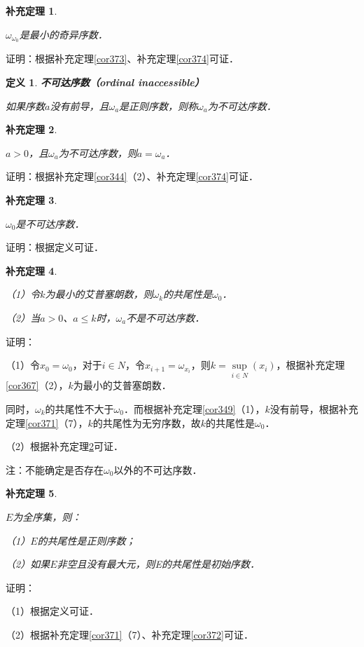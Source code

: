 \documentclass[12pt, a4paper, oneside]{book}
\newtheorem{cor}{补充定理}
\newtheorem{de}{定义}
\begin{document}
			\begin{cor}\label{cor375}
				\hfill\par
				$\omega_{\omega_0}$是最小的奇异序数．
			\end{cor}
			证明：根据补充定理\ref{cor373}、补充定理\ref{cor374}可证．
			
			\begin{de}
				\textbf{不可达序数（ordinal inaccessible）}
				\par
				如果序数$a$没有前导，且$\omega_a$是正则序数，则称$\omega_a$为不可达序数．
			\end{de}
			
			\begin{cor}\label{cor376}
				\hfill\par
				$a>0$，且$\omega_a$为不可达序数，则$a=\omega_a$．
			\end{cor}
			证明：根据补充定理\ref{cor344}（2）、补充定理\ref{cor374}可证．
			
			\begin{cor}\label{cor377}
				\hfill\par
				$\omega_0$是不可达序数．
			\end{cor}
			证明：根据定义可证．
			
			\begin{cor}\label{cor378}
				\hfill\par
				（1）令$k$为最小的艾普塞朗数，则$\omega_k$的共尾性是$\omega_0$．
				\par
				（2）当$a>0$、$a\leq k$时，$\omega_a$不是不可达序数．
			\end{cor}
			证明：
			\par
			（1）令$x_0=\omega_0$，对于$i\in N$，令$x_{i+1}=\omega_{x_i}$，则$k=\mathop{sup}\limits_{i\in N}(x_i)$，根据补充定理\ref{cor367}（2），$k$为最小的艾普塞朗数．
			\par
			同时，$\omega_k$的共尾性不大于$\omega_0$．而根据补充定理\ref{cor349}（1），$k$没有前导，根据补充定理\ref{cor371}（7），$k$的共尾性为无穷序数，故$k$的共尾性是$\omega_0$．
			\par
			（2）根据补充定理\ref{cor376}可证．
			\par
			注：不能确定是否存在$\omega_0$以外的不可达序数．
			
			\begin{cor}\label{cor379}
				\hfill\par
				$E$为全序集，则：
				\par
				（1）$E$的共尾性是正则序数；
				\par
				（2）如果$E$非空且没有最大元，则E的共尾性是初始序数．
			\end{cor}
			证明：
			\par
			（1）根据定义可证．
			\par
			（2）根据补充定理\ref{cor371}（7）、补充定理\ref{cor372}可证．
			
\end{document}

